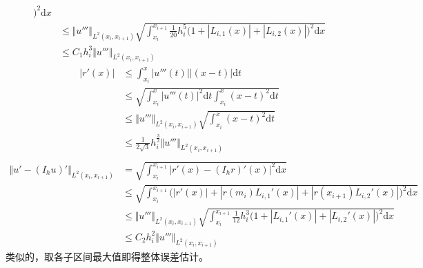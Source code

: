 \documentclass[a4paper]{article}
\begin{document}
\begin{enumerate}
\begin{equation}
\begin{aligned}
{                    \big)^2\text{d}x}\\
                    &\leq \Vert u''' \Vert_{L^2(x_i,x_{i+1})} 
                    \sqrt{\int_{x_i}^{x_{i+1}}\frac{1}{20}h_i^5\big(
                        1 + |L_{i,1}(x)|
                        + |L_{i,2}(x)|
                    \big)^2\text{d}x}\\
                    &\leq C_1 h_i^3 \Vert u''' \Vert_{L^2(x_i,x_{i+1})}
                \end{aligned}
            \end{equation}
            \begin{equation}
                \begin{aligned}
                    |r'(x)| &\leq \int_{x_i}^{x}|u'''(t)||(x-t)|\text{d}t\\
                    &\leq \sqrt{\int_{x_i}^{x}|u'''(t)|^2\text{d}t \int_{x_i}^{x}(x-t)^2\text{d}t}\\
                    &\leq \Vert u''' \Vert_{L^2(x_i,x_{i+1})} \sqrt{\int_{x_i}^{x}(x-t)^2\text{d}t}\\
                    &\leq \frac{1}{2\sqrt{3}} h_i^{\frac{3}{2}} \Vert u''' \Vert_{L^2(x_i,x_{i+1})}\\
                \end{aligned}
            \end{equation}
            \begin{equation}
                \begin{aligned}
                    \Vert u'-(I_h u)' \Vert_{L^2(x_i,x_{i+1})}
                    &= \sqrt{\int_{x_i}^{x_{i+1}}|r'(x)- (I_h r)'(x)|^2\text{d}x}\\
                    &\leq \sqrt{\int_{x_i}^{x_{i+1}}\big(
                        |r'(x)| + |r(m_i)L_{i,1}'(x)|
                        + |r(x_{i+1})L_{i,2}'(x)|
                    \big)^2\text{d}x}\\
                    &\leq \Vert u''' \Vert_{L^2(x_i,x_{i+1})} 
                    \sqrt{\int_{x_i}^{x_{i+1}}\frac{1}{12}h_i^3\big(
                        1 + |L_{i,1}'(x)|
                        + |L_{i,2}'(x)|
                    \big)^2\text{d}x}\\
                    &\leq C_2 h_i^2 \Vert u''' \Vert_{L^2(x_i,x_{i+1})}
                \end{aligned}
            \end{equation}
            类似的，取各子区间最大值即得整体误差估计。
\end{enumerate}
\end{document}
